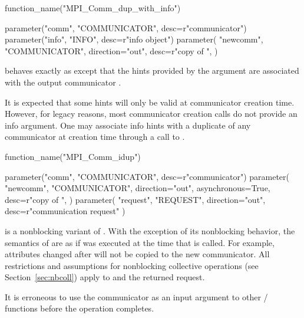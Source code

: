 %
\begin{mpi-binding}
    function_name("MPI_Comm_dup_with_info")
    
    parameter("comm", "COMMUNICATOR", desc=r"communicator")
    parameter("info", "INFO", desc=r"info object")
    parameter(
        "newcomm",
        "COMMUNICATOR",
        direction="out",
        desc=r"copy of ",
    )
\end{mpi-binding}

 behaves exactly as
 except that the
hints provided by the argument  are
associated with the output communicator .

\begin{rationale}
It is expected that some hints will only be valid at communicator
creation time. However, for legacy reasons, most communicator creation
calls do not provide an info argument. One may associate info hints
with a duplicate of any communicator at creation time through a call
to .
\end{rationale}

%
\begin{mpi-binding}
    function_name("MPI_Comm_idup")
    
    parameter("comm", "COMMUNICATOR", desc=r"communicator")
    parameter(
        "newcomm",
        "COMMUNICATOR",
        direction="out",
        asynchronous=True,
        desc=r"copy of ",
    )
    parameter(
        "request", "REQUEST", direction="out", desc=r"communication request"
    )
\end{mpi-binding}

 is a nonblocking variant of .
With the exception of its nonblocking behavior, the semantics
of  are as if  was executed at the time
that  is called.
For example, attributes changed
after  will not be copied to the new communicator. All
restrictions and assumptions for nonblocking collective
operations (see Section~\ref{sec:nbcoll}) apply to  and
the returned request.

It is erroneous to use the communicator  as an
input argument to other \MPI/ functions before the 
operation completes.

